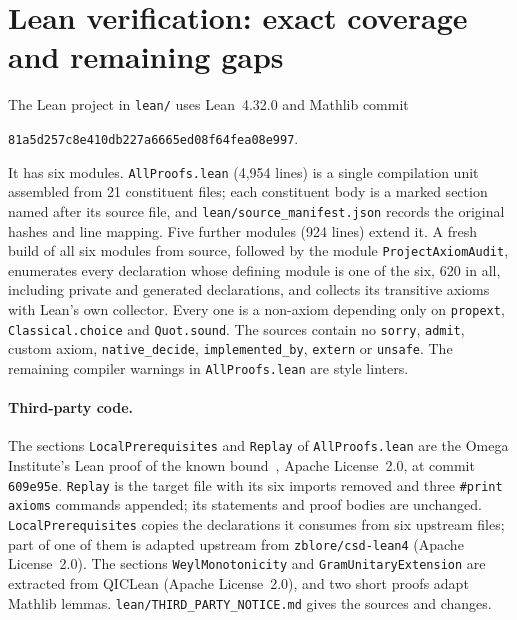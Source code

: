 \section{Lean verification: exact coverage and remaining gaps}\label{sec:formal}
The Lean project in \texttt{lean/} uses Lean~4.32.0 and Mathlib commit
\begin{center}\small\texttt{81a5d257c8e410db227a6665ed08f64fea08e997}.\end{center}
It has six modules. \texttt{AllProofs.lean} (4,954 lines) is a single
compilation unit assembled from 21 constituent files; each constituent body
is a marked section named after its source file, and
\texttt{lean/source\_manifest.json} records the original hashes and line
mapping. Five further modules (924 lines) extend it. A fresh build of all
six modules from source, followed by the module
\texttt{ProjectAxiomAudit}, enumerates every declaration whose defining
module is one of the six, 620 in all, including private and generated
declarations, and collects its transitive axioms with Lean's own collector.
Every one is a non-axiom depending only on \texttt{propext},
\texttt{Classical.choice} and \texttt{Quot.sound}. The sources contain no
\texttt{sorry}, \texttt{admit}, custom axiom, \texttt{native\_decide},
\texttt{implemented\_by}, \texttt{extern} or \texttt{unsafe}. The remaining
compiler warnings in \texttt{AllProofs.lean} are style linters.

\paragraph{Third-party code.} The sections \texttt{LocalPrerequisites} and
\texttt{Replay} of \texttt{AllProofs.lean} are the Omega Institute's Lean
proof of the known bound~\cite{publicproof}, Apache License~2.0, at commit
\texttt{609e95e}. \texttt{Replay} is the target file with its six imports
removed and three \texttt{\#print axioms} commands appended; its statements
and proof bodies are unchanged. \texttt{LocalPrerequisites} copies the
declarations it consumes from six upstream files; part of one of them is
adapted upstream from \texttt{zblore/csd-lean4} (Apache License~2.0). The
sections \texttt{WeylMonotonicity} and \texttt{GramUnitaryExtension} are
extracted from QICLean (Apache License~2.0), and two short proofs adapt
Mathlib lemmas. \texttt{lean/THIRD\_PARTY\_NOTICE.md} gives the sources and
changes.

